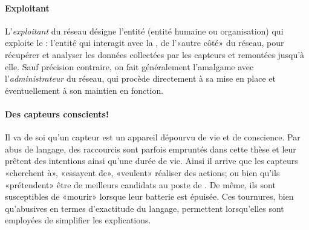             \paragraph{Exploitant}
L'\textit{exploitant} du réseau désigne l'entité (entité humaine ou organisation) qui exploite le \rcsfs: l'entité qui interagit avec la \sdb, de l'«autre côté» du réseau, pour récupérer et analyser les données collectées par les capteurs et remontées jusqu'à elle.
Sauf précision contraire, on fait généralement l'amalgame avec l'\textit{administrateur} du réseau, qui procède directement à sa mise en place et éventuellement à son maintien en fonction.

            \paragraph{Des capteurs conscients!}
Il va de soi qu'un capteur est un appareil dépourvu de vie et de conscience.
Par abus de langage, des raccourcis sont parfois empruntés dans cette thèse et leur prêtent des intentions ainsi qu'une durée de vie.
Ainsi il arrive que les capteurs «cherchent à», «essayent de», «veulent» réaliser des actions; ou bien qu'ils «prétendent» être de meilleurs candidats au poste de \ch.
De même, ils sont susceptibles de «mourir» lorsque leur batterie est épuisée.
Ces tournures, bien qu'abusives en termes d'exactitude du langage, permettent lorsqu'elles sont employées de simplifier les explications.
